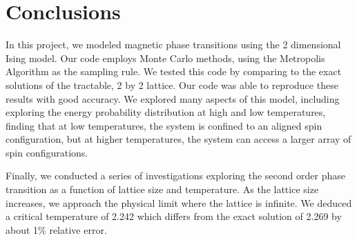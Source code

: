 \documentclass[%
oneside,                 %
final,                   %
10pt]{article}
\begin{document}
\section{Conclusions}

In this project, we modeled magnetic phase transitions using the 2 dimensional Ising model.  Our code employs Monte Carlo methods, using the Metropolis Algorithm as the sampling rule.  We tested this code by comparing to the exact solutions of the tractable, 2 by 2 lattice.  Our code was able to reproduce these results with good accuracy.  We explored many aspects of this model, including exploring the energy probability distribution at high and low temperatures, finding that at low temperatures, the system is confined to an aligned spin configuration, but at higher temperatures, the system can access a larger array of spin configurations.

Finally, we conducted a series of investigations exploring the second order phase transition as a function of lattice size and temperature.  As the lattice size increases, we approach the physical limit where the lattice is infinite.  We deduced a critical temperature of 2.242 which differs from the exact solution of 2.269 by about 1$\%$ relative error.

\end{document}
